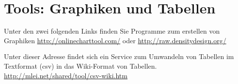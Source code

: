 \documentclass[12pt,a4paper, twosite]{article}
\begin{document}
\section*{Tools: Graphiken und Tabellen}
Unter den zwei folgenden Links finden Sie Programme zum erstellen von Graphiken
\url{http://onlinecharttool.com/} oder \url{http://raw.densitydesign.org/}

Unter dieser Adresse findet sich ein Service zum Umwandeln von Tabellen im Textformat (csv) in das Wiki-Format von Tabellen.
\url{http://mlei.net/shared/tool/csv-wiki.htm}
\end{document}
